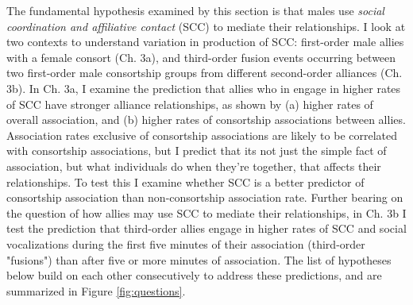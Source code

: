 \documentclass[11pt]{amsart}
\begin{document}
The fundamental hypothesis examined by this section is that males use \emph{social coordination and affiliative contact} (SCC) to mediate their relationships. I look at two contexts to understand variation in production of SCC: first-order male allies with a female consort (Ch. 3a), and third-order fusion events occurring between two first-order male consortship groups from different second-order alliances (Ch. 3b). In Ch. 3a, I examine the prediction that allies who in engage in higher rates of SCC have stronger alliance relationships, as shown by (a) higher rates of overall association, and (b) higher rates of consortship associations between allies. 
Association rates exclusive of consortship associations are likely to be correlated with consortship associations, %
but I predict that its not just the simple fact of association, but what individuals do when they're together, that affects their relationships. To test this I examine whether SCC is a better predictor of consortship association than non-consortship association rate. Further bearing on the question of how allies may use SCC to mediate their relationships, in Ch. 3b I test the prediction that third-order allies engage in higher rates of SCC and social vocalizations during the first five minutes of their association (third-order "fusions") than after five or more minutes of association. The list of hypotheses below build on each other consecutively to address these predictions, and are summarized in Figure \ref{fig:questions}.


%
%
%
\end{document}

